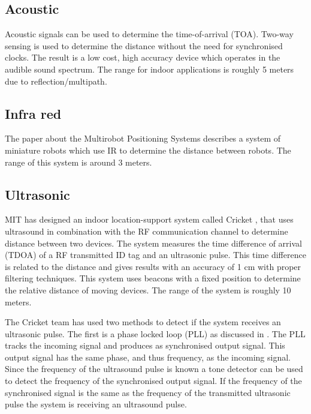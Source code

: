 \subsection*{Acoustic}

Acoustic signals \cite{Peng2007} can be used to determine the time-of-arrival (TOA). Two-way sensing is used to determine the distance without the need for synchronised clocks. The result is a low cost, high accuracy device which operates in the audible sound spectrum. The range for indoor applications is roughly 5 meters due to reflection/multipath.

\subsection*{Infra red}

The paper about the Multirobot Positioning Systems \cite{Pugh2009} describes a system of miniature robots which use IR to determine the distance between robots. The range of this system is around 3 meters.

\subsection*{Ultrasonic}
MIT has designed an indoor location-support system called Cricket \cite{Priyantha2000,Priyantha2005,Balakrishnan2003,Smith2005}, that uses ultrasound in combination with the RF communication channel to determine distance between two devices.
The system measures the time difference of arrival (TDOA) of a RF transmitted ID tag and an ultrasonic pulse.
This time difference is related to the distance and gives results with an accuracy of 1 cm with proper filtering techniques. This system uses beacons with a fixed position to determine the relative distance of moving devices.
The range of the system is roughly 10 meters.

The Cricket team has used two methods to detect if the system receives an ultrasonic pulse. The first is a phase locked loop (PLL) as discussed in \cite{Hsieh1996}.
The PLL tracks the incoming signal and produces as synchronised output signal.
This output signal has the same phase, and thus frequency, as the incoming signal.
Since the frequency of the ultrasound pulse is known a tone detector can be used to detect the frequency of the synchronised output signal.
If the frequency of the synchronised signal is the same as the frequency of the transmitted ultrasonic pulse the system is receiving an ultrasound pulse.


